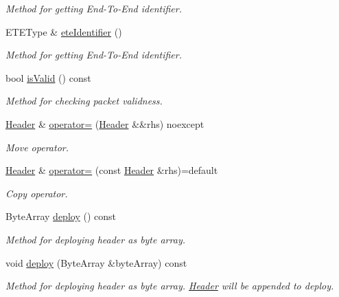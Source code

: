 \begin{DoxyCompactItemize}
\begin{DoxyCompactList}\small\item\em Method for getting End-\/\+To-\/\+End identifier. \end{DoxyCompactList}\item 
E\+T\+E\+Type \& \hyperlink{classDiameter_1_1Packet_1_1Header_a7c560309887342069e4c8cd5548e7259}{ete\+Identifier} ()
\begin{DoxyCompactList}\small\item\em Method for getting End-\/\+To-\/\+End identifier. \end{DoxyCompactList}\item 
bool \hyperlink{classDiameter_1_1Packet_1_1Header_acddf8e84f63f81e44b3b7f0108e7528c}{is\+Valid} () const
\begin{DoxyCompactList}\small\item\em Method for checking packet validness. \end{DoxyCompactList}\item 
\hyperlink{classDiameter_1_1Packet_1_1Header}{Header} \& \hyperlink{classDiameter_1_1Packet_1_1Header_ae863a0e3740a82b3418494cfa15f4530}{operator=} (\hyperlink{classDiameter_1_1Packet_1_1Header}{Header} \&\&rhs) noexcept
\begin{DoxyCompactList}\small\item\em Move operator. \end{DoxyCompactList}\item 
\hyperlink{classDiameter_1_1Packet_1_1Header}{Header} \& \hyperlink{classDiameter_1_1Packet_1_1Header_a3dc74d805164823f4074269da9932c1b}{operator=} (const \hyperlink{classDiameter_1_1Packet_1_1Header}{Header} \&rhs)=default
\begin{DoxyCompactList}\small\item\em Copy operator. \end{DoxyCompactList}\item 
Byte\+Array \hyperlink{classDiameter_1_1Packet_1_1Header_a49c18e76b6aadb478efc9a592323b5a3}{deploy} () const
\begin{DoxyCompactList}\small\item\em Method for deploying header as byte array. \end{DoxyCompactList}\item 
void \hyperlink{classDiameter_1_1Packet_1_1Header_ae60b1ea0904d4d6bb98a7e5b8cbb5d11}{deploy} (Byte\+Array \&byte\+Array) const
\begin{DoxyCompactList}\small\item\em Method for deploying header as byte array. \hyperlink{classDiameter_1_1Packet_1_1Header}{Header} will be appended to deploy. \end{DoxyCompactList}\end{DoxyCompactItemize}
